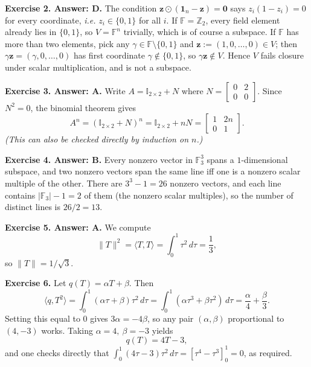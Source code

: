 \documentclass[../../book]{subfiles}
\begin{document}
\textbf{Exercise 2. Answer: D.} The condition $\mathbf{z}\odot(\mathbf{1}_n-\mathbf{z})=\mathbf{0}$ says $z_i(1-z_i)=0$ for every coordinate, \textit{i.e.} $z_i \in \{0,1\}$ for all $i$. 
If $\mathbb{F}=\mathbb{Z}_2$, every field element already lies in $\{0,1\}$, so $V = \mathbb{F}^n$ trivially, which is of course a subspace. 
If $\mathbb{F}$ has more than two elements, pick any $\gamma \in \mathbb{F}\setminus\{0,1\}$ and $\mathbf{z}:=(1,0,\dots,0)\in V$; then $\gamma\mathbf{z} = (\gamma,0,\dots,0)$ has first coordinate $\gamma\notin\{0,1\}$, so $\gamma\mathbf{z}\notin V$. Hence $V$ fails closure under scalar multiplication, and is not a subspace.

\textbf{Exercise 3. Answer: A.} Write $A = \mathbb{I}_{2 \times 2} + N$ where $N = \begin{bmatrix} 0&2\\0&0\end{bmatrix}$. Since $N^2 = 0$, the binomial theorem gives
\begin{equation*}
    A^n = (\mathbb{I}_{2 \times 2}+N)^n = \mathbb{I}_{2 \times 2} + nN = \begin{bmatrix} 1 & 2n \\ 0 & 1\end{bmatrix}.
\end{equation*}
\textit{(This can also be checked directly by induction on $n$.)}

\textbf{Exercise 4. Answer: B.} Every nonzero vector in $\mathbb{F}_3^3$ spans a $1$-dimensional subspace, and two nonzero vectors span the same line iff one is a nonzero scalar multiple of the other. There are $3^3-1=26$ nonzero vectors, and each line contains $|\mathbb{F}_3|-1=2$ of them (the nonzero scalar multiples), so the number of distinct lines is $26/2=13$.

\textbf{Exercise 5. Answer: A.} We compute
\begin{equation*}
    \|T\|^2 = \langle T, T\rangle = \int_0^1 \tau^2\,d\tau = \frac{1}{3},
\end{equation*}
so $\|T\| = 1/\sqrt{3}$.

\textbf{Exercise 6.} Let $q(T) = \alpha T + \beta$. Then
\begin{equation*}
    \langle q, T^2\rangle = \int_0^1 (\alpha \tau+\beta)\tau^2\,d\tau = \int_0^1 (\alpha \tau^3 + \beta \tau^2)\,d\tau = \frac{\alpha}{4}+\frac{\beta}{3}.
\end{equation*}
Setting this equal to $0$ gives $3\alpha = -4\beta$, so any pair $(\alpha,\beta)$ proportional to $(4,-3)$ works. Taking $\alpha=4,\ \beta=-3$ yields
\begin{equation*}
    q(T) = 4T-3,
\end{equation*}
and one checks directly that $\int_0^1 (4\tau-3)\tau^2\,d\tau = \left[\tau^4-\tau^3\right]_0^1 = 0$, as required.
\end{document}
